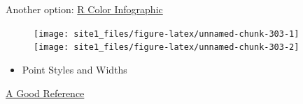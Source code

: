 \documentclass[]{book}
\newenvironment{Shaded}{\begin{snugshade}}{\end{snugshade}}
\newcommand{\KeywordTok}[1]{\textcolor[rgb]{0.13,0.29,0.53}{\textbf{#1}}}
\newcommand{\DataTypeTok}[1]{\textcolor[rgb]{0.13,0.29,0.53}{#1}}
\newcommand{\DecValTok}[1]{\textcolor[rgb]{0.00,0.00,0.81}{#1}}
\newcommand{\StringTok}[1]{\textcolor[rgb]{0.31,0.60,0.02}{#1}}
\newcommand{\CommentTok}[1]{\textcolor[rgb]{0.56,0.35,0.01}{\textit{#1}}}
\newcommand{\OperatorTok}[1]{\textcolor[rgb]{0.81,0.36,0.00}{\textbf{#1}}}
\newcommand{\NormalTok}[1]{#1}
\providecommand{\tightlist}{%
  \setlength{\itemsep}{0pt}\setlength{\parskip}{0pt}}
\begin{document}
Another option:
\href{http://research.stowers-institute.org/efg/R/Color/Chart/ColorsChart1.jpg}{R
Color Infographic}

\begin{Shaded}
\end{Shaded}

\begin{figure}

{\centering \texttt{[image: site1\_files/figure-latex/unnamed-chunk-303-1]} \texttt{[image: site1\_files/figure-latex/unnamed-chunk-303-2]} 

}

\caption{ }\label{fig:unnamed-chunk-303}
\end{figure}

\begin{itemize}
\tightlist
\item
  Point Styles and Widths
\end{itemize}

\href{http://www.endmemo.com/program/R/pic/pchsymbols.png}{A Good
Reference}
\end{document}
